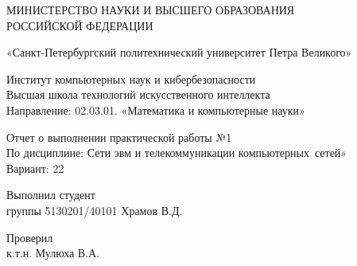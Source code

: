     \begin{titlepage}
        \thispagestyle{empty}
        
        \begin{center}
        
            { \large МИНИСТЕРСТВО НАУКИ И ВЫСШЕГО ОБРАЗОВАНИЯ \\ 
                РОССИЙСКОЙ ФЕДЕРАЦИИ }
             
            { «Санкт-Петербургский политехнический университет Петра Великого» }
            
            { Институт компьютерных наук и кибербезопасности \\ 
                Высшая школа технологий искусственного интеллекта \\
                Направление: 02.03.01. «Математика и компьютерные науки» \\ }        
              
              \vspace{3cm}
            { \large Отчет о выполнении практической работы №1 \\ 
              По дисциплине: Сети эвм и телекоммуникации компьютерных~сетей» \\ 
              Вариант: 22
            }
    
        \end{center}
    
        \vspace{3cm}

        \begin{center}
            \noindent
            \begin{minipage}[t]{\textwidth}
                \raggedright Выполнил студент \\ группы 5130201/40101\hfill 
                \underline{\hspace{3cm}} Храмов В.Д.
            \end{minipage}
            
            \vspace{1cm}
            
            \noindent
            \begin{minipage}[t]{\textwidth}
                \raggedright Проверил \\ к.т.н. \hfill 
                \underline{\hspace{3cm}} Мулюха В.А.
            \end{minipage}
        \end{center}
        

\end{titlepage}
